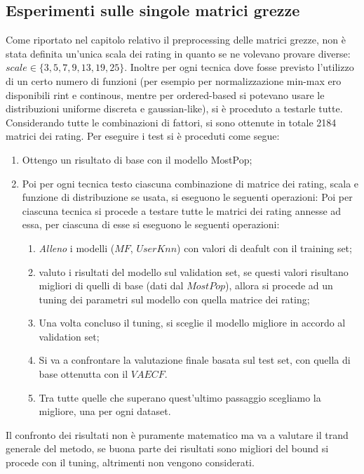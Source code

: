 \subsection{Esperimenti sulle singole matrici grezze}
Come riportato nel capitolo relativo il preprocessing delle matrici grezze, non è stata definita un'unica scala dei rating in quanto se ne volevano provare diverse: $scale \in \{3, 5, 7, 9, 13, 19, 25\}$.
Inoltre per ogni tecnica dove fosse previsto l'utilizzo di un certo numero di funzioni (per esempio per normalizzazione min-max ero disponibili rint e continous, mentre per ordered-based si potevano usare le distribuzioni uniforme discreta e gaussian-like), si è proceduto a testarle tutte.
Considerando tutte le combinazioni di fattori, si sono ottenute in totale 2184 matrici dei rating.
Per eseguire i test si è proceduti come segue:
\begin{enumerate}
    \item Ottengo un risultato di base con il modello MostPop;
    \item Poi per ogni tecnica testo ciascuna combinazione di matrice dei rating, scala e funzione di distribuzione se usata, si eseguono le seguenti operazioni:
    Poi per ciascuna tecnica si procede a testare tutte le matrici dei rating annesse ad essa, per ciascuna di esse si eseguono le seguenti operazioni:
    \begin{enumerate}
        \item \textit{Alleno} i modelli ($MF$, $UserKnn$) con valori di deafult con il training set;
        \item valuto i risultati del modello sul validation set, se questi valori risultano migliori di quelli di base (dati dal $MostPop$), allora si procede ad un tuning dei parametri sul modello con quella matrice dei rating;
        \item Una volta concluso il tuning, si sceglie il modello migliore in accordo al validation set;
        \item Si va a confrontare la valutazione finale basata sul test set, con quella di base ottenutta con il $VAECF$.
        \item Tra tutte quelle che superano quest'ultimo passaggio scegliamo la migliore, una per ogni dataset.
    \end{enumerate}
\end{enumerate}

Il confronto dei risultati non è puramente matematico ma va a valutare il trand generale del metodo, se buona parte dei risultati sono migliori del bound si procede con il tuning, altrimenti non vengono considerati.

